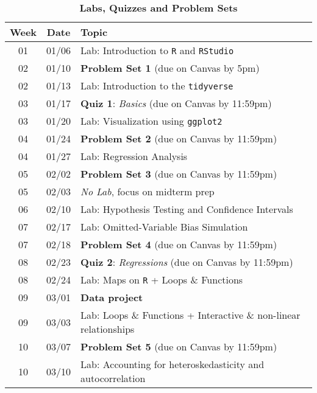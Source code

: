 \documentclass[10pt]{article}
\newcommand{\ra}[1]{\renewcommand{\arraystretch}{#1}}
\begin{document}
\newpage

\begin{table}[h!]
	\caption*{\large\textbf{Labs, Quizzes and Problem Sets}}
	\centering
	\ra{1.5}
	\begin{tabular}{@{\extracolsep{0.5cm}} c c l @{}}
		\toprule
		\textbf{Week} & \textbf{Date} & \textbf{Topic}  \\ \toprule
		01 & 01/06 & Lab: Introduction to \texttt{R} and \texttt{RStudio} \\ 
		02 & 01/10 & \textbf{Problem Set 1} (due on Canvas by 5pm)  \\
		02 & 01/13 & Lab: Introduction to the \texttt{tidyverse} \\ \midrule 
		03 & 01/17 & \textbf{Quiz 1}: \textit{Basics} (due on Canvas by 11:59pm) \\
		03 & 01/20 & Lab: Visualization using \texttt{ggplot2} \\
		04 & 01/24 & \textbf{Problem Set 2} (due on Canvas by 11:59pm)  \\ 
		04 & 01/27 & Lab: Regression Analysis \\ 
		05 & 02/02 & \textbf{Problem Set 3} (due on Canvas by 11:59pm) \\ 
		05 & 02/03 & {\it No Lab}, focus on midterm prep \\  \midrule
		06 & 02/10 & Lab: Hypothesis Testing and Confidence Intervals \\ 
		07 & 02/17 & Lab: Omitted-Variable Bias Simulation \\
		07 & 02/18 & \textbf{Problem Set 4} (due on Canvas by 11:59pm)  \\
		08 & 02/23 & \textbf{Quiz 2}: \textit{Regressions} (due on Canvas by 11:59pm) \\ 
		08 & 02/24 & Lab: Maps on \texttt{R} + Loops \& Functions \\ \midrule
		09 & 03/01 & {\bf Data project}  \\  
		09 & 03/03 & Lab: Loops \& Functions + Interactive \& non-linear relationships \\
		10 & 03/07 & \textbf{Problem Set 5} (due on Canvas by 11:59pm) \\
		10 & 03/10 & Lab: Accounting for heteroskedasticity and autocorrelation \\ \bottomrule
	\end{tabular}
\end{table}
\end{document}
